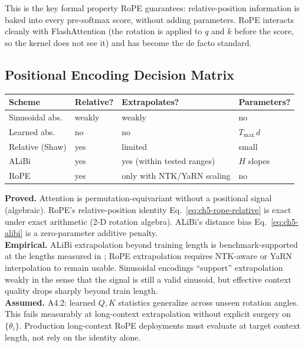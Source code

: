 This is the key formal property RoPE guarantees: relative-position
information is baked into every pre-softmax score, without adding
parameters. RoPE interacts cleanly with FlashAttention (the rotation
is applied to $q$ and $k$ before the score, so the kernel does not
see it) and has become the de facto standard.

\subsection{Positional Encoding Decision Matrix}

\begin{center}
\begin{tabular}{|l|l|l|l|}
\hline
Scheme & Relative? & Extrapolates? & Parameters? \\
\hline
Sinusoidal abs. & weakly & weakly  & no \\
Learned abs.    & no     & no      & $T_{\max}\,d$ \\
Relative (Shaw) & yes    & limited & small \\
ALiBi           & yes    & yes (within tested ranges) & $H$ slopes \\
RoPE            & yes    & only with NTK/YaRN scaling & no \\
\hline
\end{tabular}
\end{center}

\begin{provedassumed}
\textbf{Proved.} Attention is permutation-equivariant without a
positional signal (algebraic). RoPE's relative-position identity
Eq.~\eqref{eq:ch5-rope-relative} is exact under exact arithmetic
(2-D rotation algebra). ALiBi's distance bias
Eq.~\eqref{eq:ch5-alibi} is a zero-parameter additive penalty. \\
\textbf{Empirical.} ALiBi extrapolation beyond training length is
benchmark-supported at the lengths measured in
\citet{press2022alibi}; RoPE extrapolation requires NTK-aware or YaRN
interpolation to remain usable. Sinusoidal encodings ``support''
extrapolation weakly in the sense that the signal is still a valid
sinusoid, but effective context quality drops sharply beyond train
length. \\
\textbf{Assumed.} A4.2: learned $Q,K$ statistics generalize across
unseen rotation angles. This fails measurably at long-context
extrapolation without explicit surgery on $\{\theta_i\}$. Production
long-context RoPE deployments must evaluate at target context
length, not rely on the identity alone.
\end{provedassumed}

